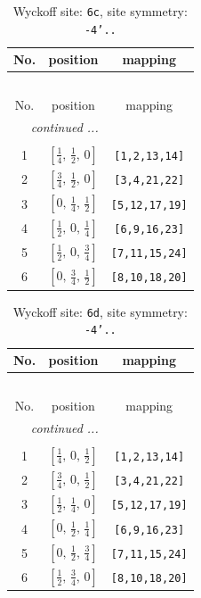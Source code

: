 \documentclass[fleqn,8pt]{jsarticle}
\begin{document}
\renewcommand{\arraystretch}{1.2}
\begin{longtable}{ccc}
\caption{Wyckoff site: {\tt 6c}, site symmetry: {\tt -4'..}}
 \\
 \hline \hline
No. & position & mapping \\ \hline \endfirsthead

\multicolumn{2}{l}{\tablename\ \thetable{}} \\
 \hline \hline
No. & position & mapping \\ \hline \endhead

 \hline \hline
\multicolumn{2}{r}{\footnotesize\it continued ...} \\ \endfoot

 \hline \hline
\multicolumn{2}{r}{} \\ \endlastfoot

1 & $\left[ \frac{1}{4},\, \frac{1}{2},\, 0 \right]$ & {\tt [1,2,13,14]} \\ \hline
2 & $\left[ \frac{3}{4},\, \frac{1}{2},\, 0 \right]$ & {\tt [3,4,21,22]} \\ \hline
3 & $\left[ 0,\, \frac{1}{4},\, \frac{1}{2} \right]$ & {\tt [5,12,17,19]} \\ \hline
4 & $\left[ \frac{1}{2},\, 0,\, \frac{1}{4} \right]$ & {\tt [6,9,16,23]} \\ \hline
5 & $\left[ \frac{1}{2},\, 0,\, \frac{3}{4} \right]$ & {\tt [7,11,15,24]} \\ \hline
6 & $\left[ 0,\, \frac{3}{4},\, \frac{1}{2} \right]$ & {\tt [8,10,18,20]} \\
\end{longtable}
\renewcommand{\arraystretch}{1.2}
\begin{longtable}{ccc}
\caption{Wyckoff site: {\tt 6d}, site symmetry: {\tt -4'..}}
 \\
 \hline \hline
No. & position & mapping \\ \hline \endfirsthead

\multicolumn{2}{l}{\tablename\ \thetable{}} \\
 \hline \hline
No. & position & mapping \\ \hline \endhead

 \hline \hline
\multicolumn{2}{r}{\footnotesize\it continued ...} \\ \endfoot

 \hline \hline
\multicolumn{2}{r}{} \\ \endlastfoot

1 & $\left[ \frac{1}{4},\, 0,\, \frac{1}{2} \right]$ & {\tt [1,2,13,14]} \\ \hline
2 & $\left[ \frac{3}{4},\, 0,\, \frac{1}{2} \right]$ & {\tt [3,4,21,22]} \\ \hline
3 & $\left[ \frac{1}{2},\, \frac{1}{4},\, 0 \right]$ & {\tt [5,12,17,19]} \\ \hline
4 & $\left[ 0,\, \frac{1}{2},\, \frac{1}{4} \right]$ & {\tt [6,9,16,23]} \\ \hline
5 & $\left[ 0,\, \frac{1}{2},\, \frac{3}{4} \right]$ & {\tt [7,11,15,24]} \\ \hline
6 & $\left[ \frac{1}{2},\, \frac{3}{4},\, 0 \right]$ & {\tt [8,10,18,20]} \\
\end{longtable}
\end{document}
